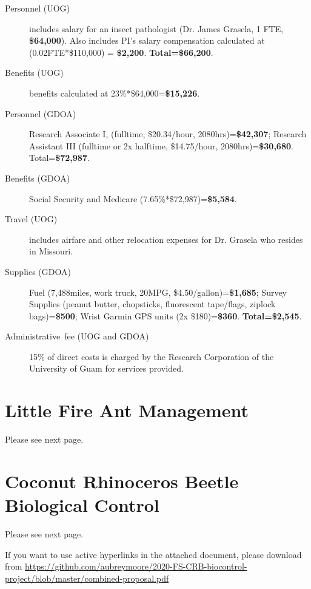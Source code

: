 \documentclass[12pt,letterpaper,english,bibliography=totocnumbered, abstract=on]{scrartcl}
\begin{document}
\begin{description}
	
	\item [{Personnel (UOG)}] includes salary for an insect pathologist (Dr. James Grasela, 1 FTE, \textbf{\$64,000}). Also includes PI's salary compensation calculated at (0.02FTE*\$110,000) = \textbf{\$2,200}. 
	\textbf{Total=\$66,200}.
	
	\item [{Benefits (UOG)}] benefits calculated at 23\%*\$64,000=\textbf{\$15,226}.

	\item [{Personnel (GDOA)}] Research Associate I, (fulltime, \$20.34/hour, 2080hrs)=\textbf{\$42,307}; 
	Research Assistant III (fulltime or 2x halftime, \$14.75/hour, 2080hrs)=\textbf{\$30,680}. Total=\textbf{\$72,987}.
	
	\item [{Benefits (GDOA)}] Social Security and Medicare (7.65\%*\$72,987)=\textbf{\$5,584}.
	
	\item [{Travel (UOG)}] includes airfare and other relocation expenses for Dr. Grasela who resides in Missouri.
	
	\item [{Supplies (GDOA)}]  
	Fuel (7,488miles, work truck, 20MPG, \$4.50/gallon)=\textbf{\$1,685}; 
	Survey Supplies (peanut butter, chopsticks, fluorescent tape/flags, ziplock bags)=\textbf{\$500}; 
	Wrist Garmin GPS units (2x \$180)=\textbf{\$360}. \textbf{Total=\$2,545}.	
	
	\item [{Administrative~fee (UOG and GDOA)}] 15\% of direct costs
	is charged by the Research Corporation of the University of Guam for
	services provided. 
	
\end{description}


\pagebreak
\section{Little Fire Ant Management}
Please see next page.



\section{Coconut Rhinoceros Beetle Biological Control}
Please see next page.

If you want to use active hyperlinks in the attached document, please download from 
\tiny{\url{https://github.com/aubreymoore/2020-FS-CRB-biocontrol-project/blob/master/combined-proposal.pdf}}
\end{document}
